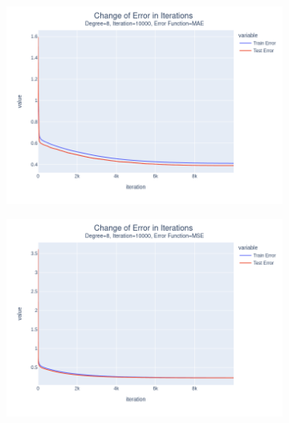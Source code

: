 \documentclass[14pt,a4]{article}
\begin{document}
\begin{figure}[h]
\begin{subfigure}{0.3\linewidth}
    \end{subfigure}
    \newline
    \begin{subfigure}{0.3\linewidth}
        \centering
        \includegraphics[width=\textwidth]{images/implementation/q1/part_d/error/8_10000_MAE.png}
    \end{subfigure}
    \hfill
    \begin{subfigure}{0.3\textwidth}
        \centering
        \includegraphics[width=\textwidth]{images/implementation/q1/part_d/error/8_10000_MSE.png}
    \end{subfigure}
    \hfill
    \begin{subfigure}{0.3\linewidth}
        \centering

\end{subfigure}
\end{figure}
\end{document}
